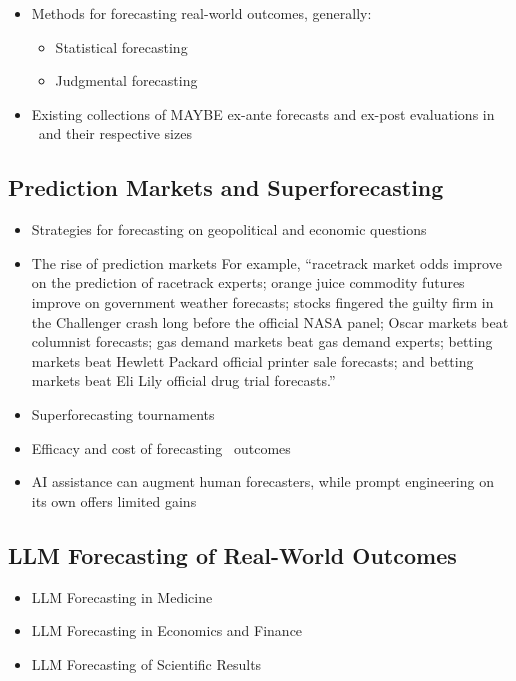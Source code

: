 \documentclass[12pt,a4paper]{article}
\newcommand{\DICT}{sustainability}
\newcommand{\ifdev}[1]{%
  \IfStrEq{\DICT}{development}{#1}{}%
}
\begin{document}
\begin{itemize}
  \item Methods for forecasting real-world outcomes, generally: 
    \begin{itemize}
      \item Statistical forecasting
      \item Judgmental forecasting
    \end{itemize}
  \item Existing collections of MAYBE ex-ante forecasts and ex-post evaluations in \DOMAIN\ and their respective sizes \ifdev{\citewithtitle{kfwdevelopmentbankIDEaL} \citewithtitle{DatenlaborbmzAwesomedevelopmentcooperationdata2025}  \citewithtitle{HowCanYou}
  }
\end{itemize}
\subsection*{Prediction Markets and Superforecasting}
\begin{itemize}
  \item Strategies for forecasting on geopolitical and economic questions 
  \item The rise of prediction markets  For example, ``racetrack market odds improve on the prediction of racetrack  experts; orange juice commodity futures improve on government weather forecasts;  stocks fingered the guilty firm in the Challenger crash long before the official NASA  panel; Oscar markets beat columnist forecasts; gas demand markets beat gas  demand experts; betting markets beat Hewlett Packard official printer sale  forecasts; and betting markets beat Eli Lily official drug trial forecasts.''
  \item Superforecasting tournaments 
  \item Efficacy and cost of forecasting \INTERVENTION\ outcomes 
  \item AI assistance can augment human forecasters, while prompt engineering on its own offers limited gains 
\end{itemize}
\subsection*{LLM Forecasting of Real-World Outcomes}
\begin{itemize}
  \item LLM Forecasting in Medicine
  \item LLM Forecasting in Economics and Finance 
  \item LLM Forecasting of Scientific Results  \   
\end{itemize}
\end{document}
